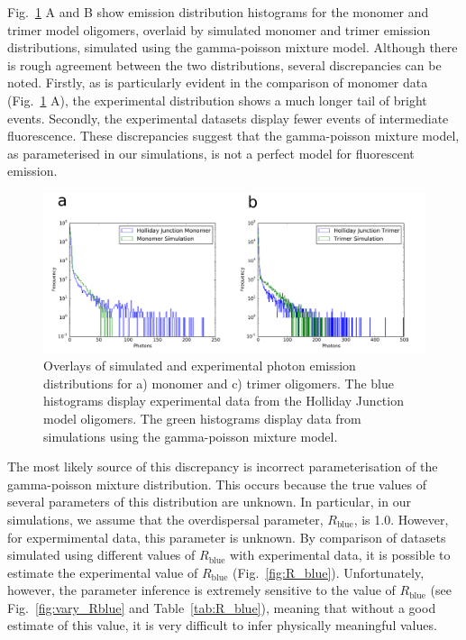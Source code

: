 Fig.~\ref{fig:HJ_sim_overlay} A and B show emission distribution histograms for the monomer and trimer model oligomers, overlaid by simulated monomer and trimer emission distributions, simulated using the gamma-poisson mixture model. Although there is rough agreement between the two distributions, several discrepancies can be noted. Firstly, as is particularly evident in the comparison of monomer data (Fig.~\ref{fig:HJ_sim_overlay} A), the experimental distribution shows a much longer tail of bright events. Secondly, the experimental datasets display fewer events of intermediate fluorescence. These discrepancies suggest that the gamma-poisson mixture model, as parameterised in our simulations, is not a perfect model for fluorescent emission.

\begin{figure}
   \begin{center}
      \includegraphics*[clip=true, width=6in]{sizing/HJ_overlays.pdf}
      \caption{Overlays of simulated and experimental photon emission distributions for a) monomer and c) trimer oligomers. The blue histograms display experimental data from the Holliday Junction model oligomers. The green histograms display data from simulations using the gamma-poisson mixture model.}
      \label{fig:HJ_sim_overlay}
   \end{center}
\end{figure}

The most likely source of this discrepancy is incorrect parameterisation of the gamma-poisson mixture distribution. This occurs because the true values of several parameters of this distribution are unknown. In particular, in our simulations, we assume that the overdispersal parameter, $R_{\text{blue}}$, is 1.0. However, for expermimental data, this parameter is unknown. By comparison of datasets simulated using different values of $R_{\text{blue}}$ with experimental data, it is possible to estimate the experimental value of $R_{\text{blue}}$ (Fig.~\ref{fig:R_blue}). Unfortunately, however, the parameter inference is extremely sensitive to the value of $R_{\text{blue}}$ (see Fig.~\ref{fig:vary_Rblue} and Table~\ref{tab:R_blue}), meaning that without a good estimate of this value, it is very difficult to infer physically meaningful values.

